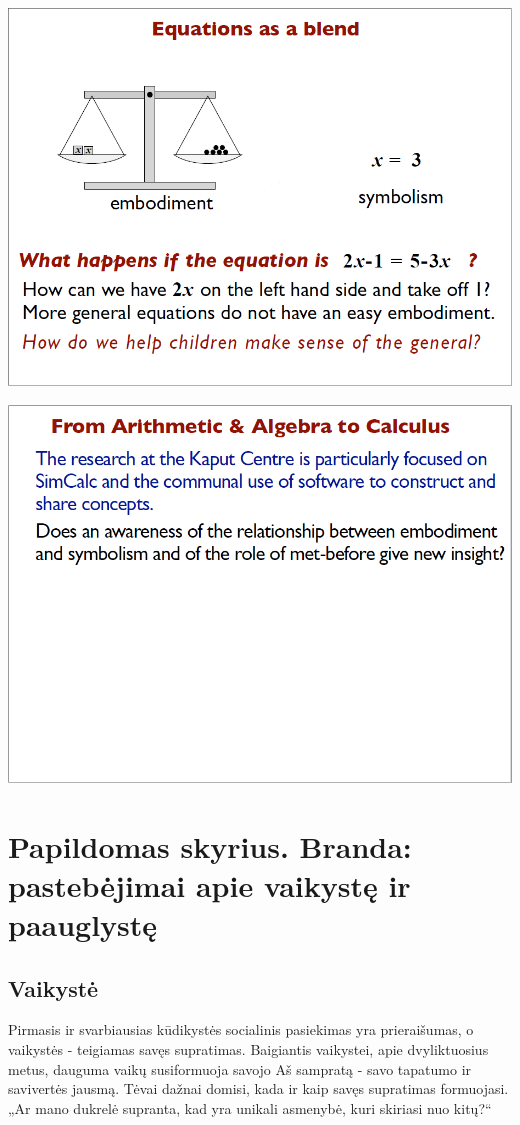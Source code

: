 \documentclass{article}
\begin{document}
\begin{minipage}[t]{0.32\linewidth} 
	\includegraphics[width=1\textwidth]{david_tall/dt21.png}
	
	\includegraphics[width=1\textwidth]{david_tall/dt24.png}
\end{minipage}
\section{Papildomas skyrius. Branda: pastebėjimai apie vaikystę ir paauglystę}

\subsection{Vaikystė}
Pirmasis ir svarbiausias kūdikystės socialinis pasiekimas yra prieraišumas, o vaikystės
- teigiamas savęs supratimas. Baigiantis vaikystei, apie dvyliktuosius metus,
dauguma vaikų susiformuoja savojo Aš sampratą - savo tapatumo ir savivertės
jausmą. Tėvai dažnai domisi, kada ir kaip savęs supratimas formuojasi.
„Ar mano dukrelė supranta, kad yra unikali asmenybė, kuri skiriasi nuo kitų?“
\end{document}
